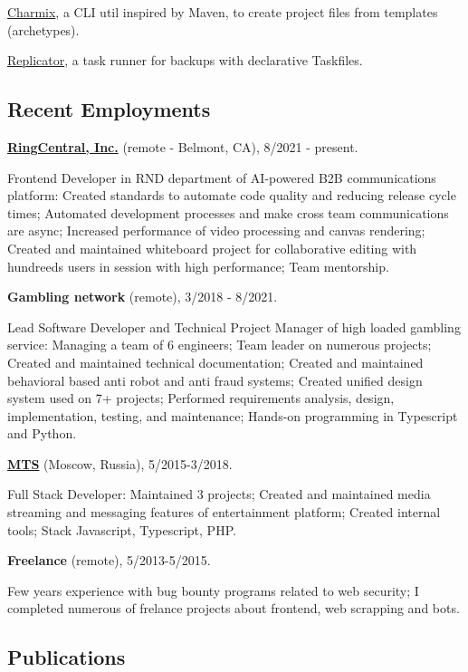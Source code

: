 \documentclass{vitonsky}
\begin{document}
\href{https://github.com/vitonsky/charmix}{Charmix}, a CLI util inspired
by Maven, to create project files from templates (archetypes).

\href{https://github.com/vitonsky/replicator}{Replicator}, a task runner
for backups with declarative Taskfiles.

\subsection*{Recent Employments}

\textbf{\href{https://www.ringcentral.com/}{RingCentral, Inc.}} (remote - Belmont, CA), 8/2021 - present.

Frontend Developer in RND department of AI-powered B2B communications platform: Created standards to automate code quality and reducing release cycle times; Automated development processes and make cross team communications are async; Increased performance of video processing and canvas rendering; Created and maintained whiteboard project for collaborative editing with hundreeds users in session with high performance; Team mentorship.

\textbf{Gambling network} (remote), 3/2018 - 8/2021.

Lead Software Developer and Technical Project Manager of high loaded gambling service: Managing a team of 6 engineers; Team leader on numerous projects; Created and maintained technical documentation; Created and maintained behavioral based anti robot and anti fraud systems; Created unified design system used on 7+ projects; Performed requirements analysis, design, implementation, testing, and maintenance; Hands-on programming in Typescript and Python.

\textbf{\href{https://mts.ru}{MTS}} (Moscow, Russia), 5/2015-3/2018.

Full Stack Developer: Maintained 3 projects; Created and maintained media streaming and messaging features of entertainment platform; Created internal tools; Stack Javascript, Typescript, PHP.

\textbf{Freelance} (remote), 5/2013-5/2015.

Few years experience with bug bounty programs related to web security; I completed numerous of frelance projects about frontend, web scrapping and bots.

\subsection*{Publications}
\end{document}
